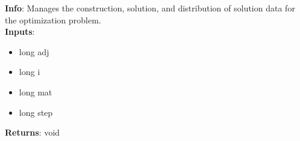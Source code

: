 \textbf{Info}: Manages the construction, solution, and distribution of solution
data for the optimization problem. \\

\noindent \textbf{Inputs}:
\begin{itemize}
\item{long adj}
\item{long i}
\item{long mat}
\item{long step}
\end{itemize}

\noindent \textbf{Returns}: void

